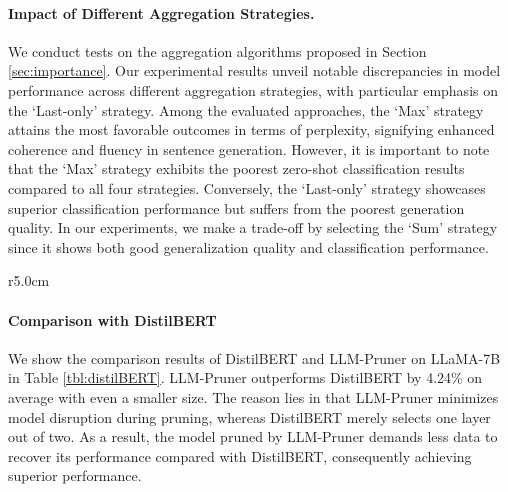 \paragraph{Impact of Different Aggregation Strategies.}
\iffalse{
\begin{wraptable}{r}{6.8cm}
    \vspace{-5mm}
    \caption{} \label{tbl:Strategy_ablation_on_llama}
\end{wraptable}
}\fi
We conduct tests on the aggregation algorithms proposed in Section \ref{sec:importance}. Our experimental results unveil notable discrepancies in model performance across different aggregation strategies, with particular emphasis on the `Last-only' strategy. Among the evaluated approaches, the `Max' strategy attains the most favorable outcomes in terms of perplexity, signifying enhanced coherence and fluency in sentence generation. However, it is important to note that the `Max' strategy exhibits the poorest zero-shot classification results compared to all four strategies. Conversely, the `Last-only' strategy showcases superior classification performance but suffers from the poorest generation quality.
In our experiments, we make a trade-off by selecting the `Sum' strategy since it shows both good generalization quality and classification performance.

\begin{wraptable}{r}{5.0cm}
    \centering
    \vspace{-4mm}
    \caption{DistilBert vs. LLM-Pruner. The average here means the average score on the above seven datasets.} \label{tbl:distilBERT}
\end{wraptable}

\paragraph{Comparison with DistilBERT} We show the comparison results of DistilBERT and LLM-Pruner on LLaMA-7B in Table \ref{tbl:distilBERT}. LLM-Pruner outperforms DistilBERT by 4.24\% on average with even a smaller size. The reason lies in that LLM-Pruner minimizes model disruption during pruning, whereas DistilBERT merely selects one layer out of two. As a result, the model pruned by LLM-Pruner demands less data to recover its performance compared with DistilBERT, consequently achieving superior performance.


